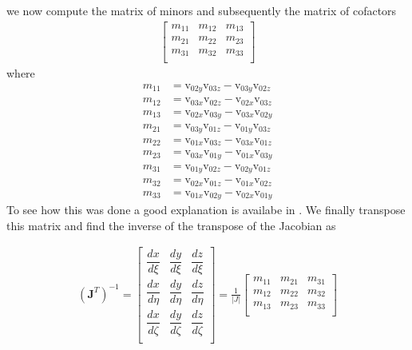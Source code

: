 \documentclass[11pt,letterpaper,titlepage]{article}
\newcommand{\beq}{\begin{equation*}
\begin{aligned}}
\newcommand{\eeq}{\end{aligned}
\end{equation*}}
\newcommand{\beqn}{\begin{equation}
	\begin{aligned}}
\newcommand{\eeqn}{\end{aligned}
	\end{equation}}
\numberwithin{equation}{section}
\begin{document}
we now compute the matrix of minors and subsequently the matrix of cofactors
\begingroup
\renewcommand*{\arraystretch}{1.5}
\beq
\begin{bmatrix}
m_{11} &m_{12} &m_{13} \\
m_{21} &m_{22} &m_{23} \\
m_{31} &m_{32} &m_{33} \\
\end{bmatrix}
\eeq
\endgroup
where
\beq 
m_{11} &= \text{v}_{02y}  \text{v}_{03z}       -        \text{v}_{03y}\text{v}_{02z} \\
m_{12} &= \text{v}_{03x}\text{v}_{02z}         -        \text{v}_{02x}  \text{v}_{03z} \\
m_{13} &= \text{v}_{02x}  \text{v}_{03y}       -        \text{v}_{03x}\text{v}_{02y} \\
m_{21} &=  \text{v}_{03y}\text{v}_{01z}         -        \text{v}_{01y}  \text{v}_{03z} \\
m_{22} &= \text{v}_{01x}  \text{v}_{03z}       -        \text{v}_{03x}\text{v}_{01z} \\
m_{23} &= \text{v}_{03x}\text{v}_{01y}         -        \text{v}_{01x}  \text{v}_{03y}\\
m_{31} &= \text{v}_{01y}  \text{v}_{02z}        -        \text{v}_{02y}\text{v}_{01z} \\
m_{32} &= \text{v}_{02x}\text{v}_{01z}          -       \text{v}_{01x}  \text{v}_{02z}\\
m_{33} &= \text{v}_{01x}  \text{v}_{02y}       -        \text{v}_{02x}\text{v}_{01y}
\eeq 
\newline
To see how this was done a good explanation is availabe in \cite{MathisFunMatrixInverse}. We finally transpose this matrix and find the inverse of the transpose of the Jacobian as

\begingroup
\renewcommand*{\arraystretch}{1.5}
\beqn \label{eq:jacobiantransposeinversetetrahedron} 
(\mathbf{J }^T)^{-1}=
\begin{bmatrix}
\dfrac{dx}{d\xi}     & \dfrac{dy}{d\xi}  &  \dfrac{dz}{d\xi} \\
\dfrac{dx}{d\eta}     & \dfrac{dy}{d\eta}  &  \dfrac{dz}{d\eta} \\
\dfrac{dx}{d\zeta}     & \dfrac{dy}{d\zeta}  &  \dfrac{dz}{d\zeta} \\
\end{bmatrix}
=
\frac{1}{|J|}
\begin{bmatrix}
m_{11} &m_{21} &m_{31} \\
m_{12} &m_{22} &m_{32} \\
m_{13} &m_{23} &m_{33} \\
\end{bmatrix}
\eeqn
\endgroup
\end{document}
